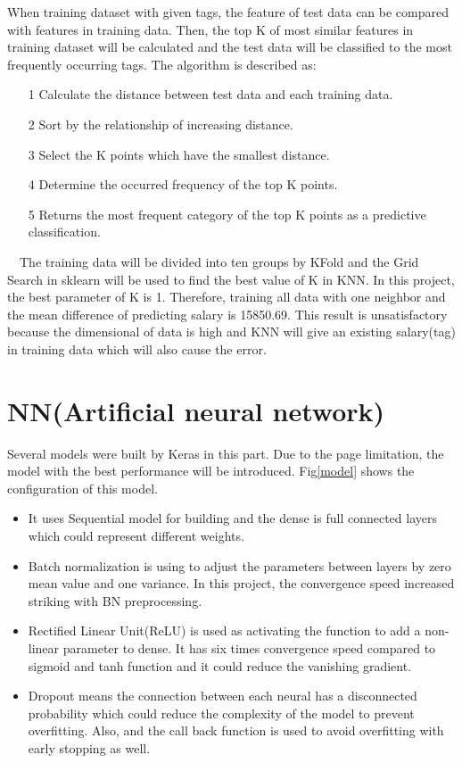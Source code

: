 \documentclass[12pt,journal,nofonttune]{IEEEtran}
\begin{document}
When training dataset with given tags, the feature of test data can be compared with features in training data. Then, the top K of most similar features in training dataset will be calculated and the test data will be classified to the most frequently occurring tags\cite{zhang2007ml}.
The algorithm is described as:

\begin{itemize}
\item[1] Calculate the distance between test data and each training data.
\item[2] Sort by the relationship of increasing distance.
\item[3] Select the K points which have the smallest distance.
\item[4] Determine the occurred frequency of the top K points.
\item[5] Returns the most frequent category of the top K points as a predictive classification.
\end{itemize}
\ \ The training data will be divided into ten groups by KFold and the Grid Search in sklearn will be used to find the best value of K in KNN. In this project, the best parameter of K is 1. Therefore, training all data with one neighbor and the mean difference of predicting salary is 15850.69. This result is unsatisfactory because the dimensional of data is high and KNN will give an existing salary(tag) in training data which will also cause the error.

\section{NN(Artificial neural network)}

Several models were built by Keras in this part. Due to the page limitation, the model with the best performance will be introduced. Fig\ref{model} shows the configuration of this model. 

\begin{itemize}
\item It uses Sequential model for building and the dense is full connected layers which could represent different weights. 
\item Batch normalization is using to adjust the parameters between layers by zero mean value and one variance\cite{ioffe2015batch}. In this project, the convergence speed increased striking with BN preprocessing.
\item Rectified Linear Unit(ReLU) is used as activating the function to add a non-linear parameter to dense. It has six times convergence speed compared to sigmoid and tanh function and it could reduce the vanishing gradient\cite{ruder2016overview}.
\item Dropout means the connection between each neural has a disconnected probability which could reduce the complexity of the model to prevent overfitting\cite{srivastava2014dropout}. Also, and the call back function is used to avoid overfitting with early stopping as well.
\end{itemize}
\end{document}
